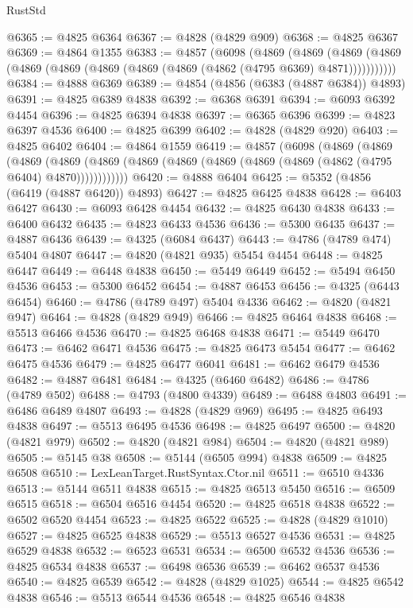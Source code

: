 \begin{lexlean}{RustStd}
\begin{coremodule}
{\begin{coremodule}
{{{{{{{{{{{{{{{{{{{{{{{{{{{{{{{{{{{{{{{{{{{{{{{{{{{{{{{{{{{{{{{{{{{{{{{{{{{{{{{{@6365 := @4825 @6364
@6367 := @4828 (@4829 @909)
@6368 := @4825 @6367
@6369 := @4864 @1355
@6383 := @4857
    (@6098
      (@4869
        (@4869
          (@4869 (@4869 (@4869 (@4869 (@4869 (@4869 (@4869 (@4862 (@4795 @6369) @4871)))))))))))
@6384 := @4888 @6369
@6389 := @4854 (@4856 (@6383 (@4887 @6384)) @4893)
@6391 := @4825 @6389 @4838
@6392 := @6368 @6391
@6394 := @6093 @6392 @4454
@6396 := @4825 @6394 @4838
@6397 := @6365 @6396
@6399 := @4823 @6397 @4536
@6400 := @4825 @6399
@6402 := @4828 (@4829 @920)
@6403 := @4825 @6402
@6404 := @4864 @1559
@6419 := @4857
    (@6098
      (@4869
        (@4869
          (@4869
            (@4869 (@4869 (@4869 (@4869 (@4869 (@4869 (@4869 (@4862 (@4795 @6404) @4870))))))))))))
@6420 := @4888 @6404
@6425 := @5352 (@4856 (@6419 (@4887 @6420)) @4893)
@6427 := @4825 @6425 @4838
@6428 := @6403 @6427
@6430 := @6093 @6428 @4454
@6432 := @4825 @6430 @4838
@6433 := @6400 @6432
@6435 := @4823 @6433 @4536
@6436 := @5300 @6435
@6437 := @4887 @6436
@6439 := @4325 (@6084 @6437)
@6443 := @4786 (@4789 @474) @5404 @4807
@6447 := @4820 (@4821 @935) @5454 @4454
@6448 := @4825 @6447
@6449 := @6448 @4838
@6450 := @5449 @6449
@6452 := @5494 @6450 @4536
@6453 := @5300 @6452
@6454 := @4887 @6453
@6456 := @4325 (@6443 @6454)
@6460 := @4786 (@4789 @497) @5404 @4336
@6462 := @4820 (@4821 @947)
@6464 := @4828 (@4829 @949)
@6466 := @4825 @6464 @4838
@6468 := @5513 @6466 @4536
@6470 := @4825 @6468 @4838
@6471 := @5449 @6470
@6473 := @6462 @6471 @4536
@6475 := @4825 @6473 @5454
@6477 := @6462 @6475 @4536
@6479 := @4825 @6477 @6041
@6481 := @6462 @6479 @4536
@6482 := @4887 @6481
@6484 := @4325 (@6460 @6482)
@6486 := @4786 (@4789 @502)
@6488 := @4793 (@4800 @4339)
@6489 := @6488 @4803
@6491 := @6486 @6489 @4807
@6493 := @4828 (@4829 @969)
@6495 := @4825 @6493 @4838
@6497 := @5513 @6495 @4536
@6498 := @4825 @6497
@6500 := @4820 (@4821 @979)
@6502 := @4820 (@4821 @984)
@6504 := @4820 (@4821 @989)
@6505 := @5145 @38
@6508 := @5144 (@6505 @994) @4838
@6509 := @4825 @6508
@6510 := LexLeanTarget.RustSyntax.Ctor.nil
@6511 := @6510 @4336
@6513 := @5144 @6511 @4838
@6515 := @4825 @6513 @5450
@6516 := @6509 @6515
@6518 := @6504 @6516 @4454
@6520 := @4825 @6518 @4838
@6522 := @6502 @6520 @4454
@6523 := @4825 @6522
@6525 := @4828 (@4829 @1010)
@6527 := @4825 @6525 @4838
@6529 := @5513 @6527 @4536
@6531 := @4825 @6529 @4838
@6532 := @6523 @6531
@6534 := @6500 @6532 @4536
@6536 := @4825 @6534 @4838
@6537 := @6498 @6536
@6539 := @6462 @6537 @4536
@6540 := @4825 @6539
@6542 := @4828 (@4829 @1025)
@6544 := @4825 @6542 @4838
@6546 := @5513 @6544 @4536
@6548 := @4825 @6546 @4838
}}}}}}}}}}}}}}}}}}}}}}}}}}}}}}}}}}}}}}}}}}}}}}}}}}}}}}}}}}}}}}}}}}}}}}}}}}}}}}}}
\end{coremodule}}
\end{coremodule}
\end{lexlean}
